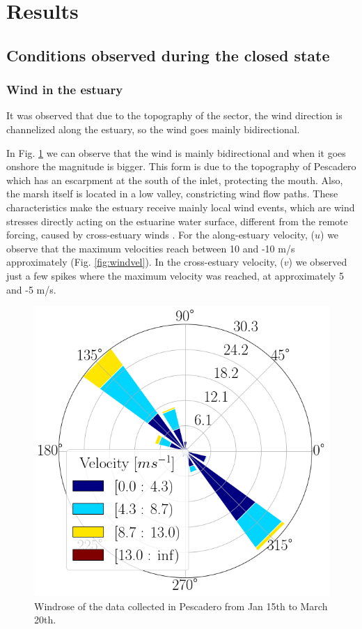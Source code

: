 \documentclass[tesis.tex]{subfiles}
\begin{document}
    
\section{Results}

\subsection{Conditions observed during the closed state}

\subsubsection{Wind in the estuary}

It was observed that due to the topography of the sector, the wind direction is channelized along the estuary, so the wind goes mainly bidirectional. 

In Fig. \ref{fig:windrose} we can observe that the wind is mainly bidirectional and when it goes onshore the magnitude is bigger. This form is due to the topography of Pescadero which has an escarpment at the south of the inlet, protecting the mouth. Also, the marsh itself is located in a low valley, constricting wind flow paths. These characteristics make the estuary receive mainly local wind events, which are wind stresses directly acting on the estuarine water surface, different from the remote forcing, caused by cross-estuary winds \citep{payandeh2019subtidal}. For the along-estuary velocity, ($u$) we observe that the maximum velocities reach between 10 and -10 m/s approximately (Fig. \ref{fig:windvel}). In the cross-estuary velocity, ($v$) we observed just a few spikes where the maximum velocity was reached, at approximately 5 and -5 m/s. 

\begin{figure}[h!]
    \centering
    \includegraphics[scale=0.3]{Imagenes/windrose.png}
    \caption{Windrose of the data collected in Pescadero from Jan 15th to March 20th.}
    \label{fig:windrose}
\end{figure}
\end{document}
